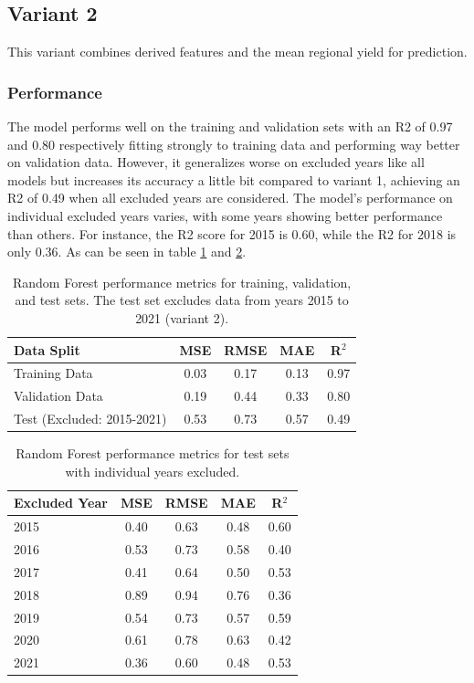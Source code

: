 \documentclass{article}
\begin{document}
\subsection{Variant 2}
This variant combines derived features and the mean regional yield for prediction.
\subsubsection{Performance}
The model performs well on the training and validation sets with an R2 of 0.97 and 0.80 respectively fitting strongly to training data and performing way better on validation data. However, it generalizes worse on excluded years like all models but increases its accuracy a little bit compared to variant 1, achieving an R2 of 0.49 when all excluded years are considered. The model's performance on individual excluded years varies, with some years showing better performance than others. For instance, the R2 score for 2015 is 0.60, while the R2 for 2018 is only 0.36.
As can be seen in table \ref{table:errors_on_datasets_variant_2} and \ref{table:errors_on_datasets_years_variant_2}.
\begin{table}[H]
	\centering
	\begin{tabular}{lcccc}
		\hline
		Data Split                 & MSE  & RMSE & MAE  & R$^2$ \\
		\hline
		Training Data              & 0.03 & 0.17 & 0.13 & 0.97  \\
		Validation Data            & 0.19 & 0.44 & 0.33 & 0.80  \\
		Test (Excluded: 2015-2021) & 0.53 & 0.73 & 0.57 & 0.49  \\
		\hline
	\end{tabular}
	\caption{\label{table:errors_on_datasets_variant_2} Random Forest performance metrics for training, validation, and test sets. The test set excludes data from years 2015 to 2021 (variant 2).}
\end{table}

\begin{table}[H]
	\centering
	\begin{tabular}{lcccc}
		\hline
		Excluded Year & MSE  & RMSE & MAE  & R$^2$ \\
		\hline
		2015          & 0.40 & 0.63 & 0.48 & 0.60  \\
		2016          & 0.53 & 0.73 & 0.58 & 0.40  \\
		2017          & 0.41 & 0.64 & 0.50 & 0.53  \\
		2018          & 0.89 & 0.94 & 0.76 & 0.36  \\
		2019          & 0.54 & 0.73 & 0.57 & 0.59  \\
		2020          & 0.61 & 0.78 & 0.63 & 0.42  \\
		2021          & 0.36 & 0.60 & 0.48 & 0.53  \\
		\hline
	\end{tabular}
	\caption{\label{table:errors_on_datasets_years_variant_2} Random Forest performance metrics for test sets with individual years excluded.}
\end{table}
\end{document}

